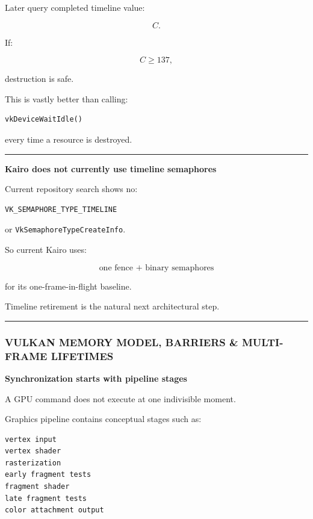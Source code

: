 Later query completed timeline value:

\[
C.
\]

If:

\[
C\ge137,
\]

destruction is safe.

This is vastly better than calling:

\begin{verbatim}
vkDeviceWaitIdle()
\end{verbatim}

every time a resource is destroyed.

\begin{center}\rule{0.5\linewidth}{0.5pt}\end{center}

\textbf{Kairo does not currently use timeline semaphores}

Current repository search shows no:

\begin{verbatim}
VK_SEMAPHORE_TYPE_TIMELINE
\end{verbatim}

or \texttt{VkSemaphoreTypeCreateInfo}.

So current Kairo uses:

\[
\boxed{
\text{one fence + binary semaphores}
}
\]

for its one-frame-in-flight baseline.

Timeline retirement is the natural next architectural step.

\begin{center}\rule{0.5\linewidth}{0.5pt}\end{center}

\subsubsection{VULKAN MEMORY MODEL, BARRIERS \& MULTI-FRAME LIFETIMES}\label{vulkan-memory-model-barriers-multi-frame-lifetimes}

\textbf{Synchronization starts with pipeline stages}

A GPU command does not execute at one indivisible moment.

Graphics pipeline contains conceptual stages such as:

\begin{verbatim}
vertex input
vertex shader
rasterization
early fragment tests
fragment shader
late fragment tests
color attachment output
\end{verbatim}

